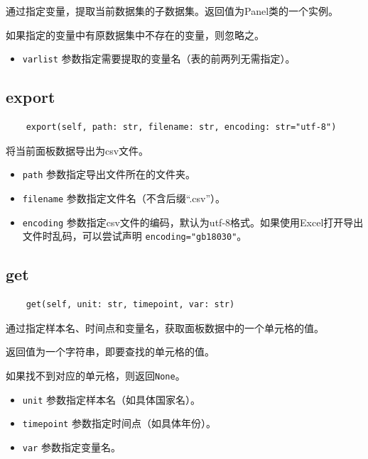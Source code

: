 \documentclass[a4paper, UTF8, fontset=none]{ctexart}
\begin{document}
    通过指定变量，提取当前数据集的子数据集。返回值为Panel类的一个实例。

    如果指定的变量中有原数据集中不存在的变量，则忽略之。

    \begin{itemize}
        \item \verb|varlist| 参数指定需要提取的变量名（表的前两列无需指定）。
    \end{itemize}

\subsection{export}

    \begin{lstlisting}
    export(self, path: str, filename: str, encoding: str="utf-8")
    \end{lstlisting}    

    将当前面板数据导出为csv文件。

    \begin{itemize}
        \item \verb|path| 参数指定导出文件所在的文件夹。
        \item \verb|filename| 参数指定文件名（不含后缀“.csv”）。
        \item \verb|encoding| 参数指定csv文件的编码，默认为utf-8格式。如果使用Excel打开导出文件时乱码，可以尝试声明 \verb|encoding="gb18030"|。
    \end{itemize}

\subsection{get}

    \begin{lstlisting}
    get(self, unit: str, timepoint, var: str)
    \end{lstlisting}    

    通过指定样本名、时间点和变量名，获取面板数据中的一个单元格的值。
    
    返回值为一个字符串，即要查找的单元格的值。

    如果找不到对应的单元格，则返回\verb|None|。

    \begin{itemize}
        \item \verb|unit| 参数指定样本名（如具体国家名）。
        \item \verb|timepoint| 参数指定时间点（如具体年份）。
        \item \verb|var| 参数指定变量名。
    \end{itemize}
\end{document}
